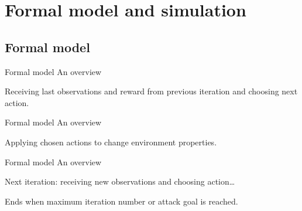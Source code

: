 \AtBeginSection[]{
	\begin{frame}
		\frametitle{}
		\tableofcontents[currentsection]
	\end{frame}
}

 
 \section{Formal model and simulation}

        \subsection{Formal model}
        
 	\begin{frame}{Formal model}
		{An overview}

            Receiving last observations and reward from previous iteration and choosing next action.

            \begin{figure}
                \centering
                
            \end{figure}
  
	\end{frame}

 	\begin{frame}{Formal model}
		{An overview}

            Applying chosen actions to change environment properties.

            \begin{figure}
                \centering
                
            \end{figure}
  
	\end{frame}

 	\begin{frame}{Formal model}
		{An overview}

            Next iteration: receiving new observations and choosing action\dots

            \begin{figure}
                \centering
                
            \end{figure}

            \vspace{-0.1cm}

            Ends when maximum iteration number or attack goal is reached.
  
	\end{frame}

